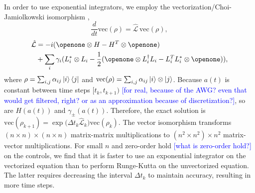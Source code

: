 In order to use exponential integrators, we employ
the vectorization/Choi-Jamiolkowski isomorphism \cite{Landi2018},
\begin{equation}
  \frac{d}{dt} \textrm{vec}({\rho}) = \hat{\mathcal{L}}\, \textrm{vec}({\rho}),
\end{equation}
\begin{equation}
  \begin{aligned}
    \hat{\mathcal{L}} &= -i(\openone \otimes H - H^{T} \otimes \openone)\\
    &+ \sum_{i} \gamma_{i}
    (L_{i}^{*} \otimes L_{i} - \frac{1}{2} (\openone \otimes L_{i}^{\dagger}L_{i}
    - L_{i}^{T}L_{i}^{*} \otimes \openone)),
  \end{aligned}
\end{equation}
where $\rho = \sum_{i, j} \alpha_{ij} \ket{i}\bra{j}$
and $\textrm{vec}(\rho) = \sum_{i, j} \alpha_{ij} \ket{i} \otimes \ket{j}$.
Because $a(t)$ is constant between time steps $[t_{k}, t_{k + 1})$ \textcolor{blue}{[for real, because of the AWG? even that would get filtered, right? or as an approximation because of discretization?]},
so are $H(a(t))$ and $\gamma_{\pm}(a(t))$.
Therefore, the exact solution is
$\textrm{vec}(\rho_{k + 1}) = {\exp}{\textstyle(}\Delta t_{k}
\hat{\mathcal{L}}_{k}{\textstyle)} \textrm{vec}(\rho_{k})$.
The vector isomorphism transforms $(n \times n) \times (n \times n)$
matrix-matrix multiplications to $(n^{2} \times n^{2}) \times n^{2}$ matrix-vector
multiplications. For small $n$ and zero-order hold \textcolor{blue}{[what is zero-order hold?]} on the controls, we find that it is
faster to use an exponential integrator on the vectorized equation than to perform
Runge-Kutta on the unvectorized equation. The latter requires decreasing the interval $\Delta t_{k}$
to maintain accuracy, resulting in more time steps.
